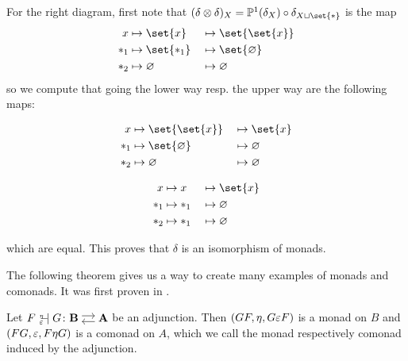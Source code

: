 \begin{example}
    For the right diagram, first note that $(\delta \tensor \delta)_X = \P^1(\delta_X) \circ \delta_{X \sqcup \set{\ast}}$
    is the map
    \begin{alignat*}{2}
        x &\mapsto \set{x} &&\mapsto \set{\set{x}} \\
        \ast_1 &\mapsto \set{\ast_1} &&\mapsto \set{\emptyset} \\
        \ast_2 &\mapsto \emptyset &&\mapsto \emptyset
    \end{alignat*}
    so we compute that going the lower way resp. the upper way are the following maps:
    \begin{figure}[H]
    \centering
    \begin{subfigure}{0.4\textwidth}
    \centering
    \begin{alignat*}{2}
        x &\mapsto \set{\set{x}} &&\mapsto \set{x} \\
        \ast_1 &\mapsto \set{\emptyset} &&\mapsto \emptyset \\
        \ast_2 &\mapsto \emptyset &&\mapsto \emptyset
    \end{alignat*}
    \end{subfigure}
    \hspace{2em}
    \begin{subfigure}{0.4\textwidth}
    \centering
    \begin{alignat*}{2}
        x &\mapsto x &&\mapsto \set{x} \\
        \ast_1 &\mapsto \ast_1 &&\mapsto \emptyset \\
        \ast_2 &\mapsto \ast_1 &&\mapsto \emptyset
        \end{alignat*}
    \end{subfigure}
    \end{figure}
    which are equal. This proves that $\delta$ is an isomorphism of monads.
\end{example}
The following theorem gives us a way to create many examples of monads and comonads.
It was first proven in \cite{huber}.
\begin{theorem}
    Let $F {\ }_{\eps}^{\text{\tiny{$\eta$}}}\!\!\!\!\adj G \colon \adjar{B}{A}$
    be an adjunction. Then $(GF,\eta,G\varepsilon F)$ is a monad on $B$ and $(FG,\varepsilon,F\eta G)$ is a comonad on $A$, which we
    call the monad respectively comonad induced by the adjunction.
\end{theorem}
